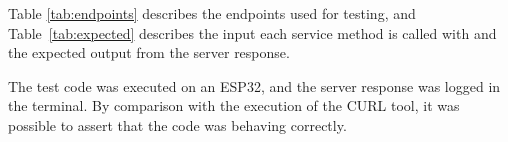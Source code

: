 \documentclass[manuscript,screen]{acmart}
\begin{document}
\begin{table}[b!]
\caption{Description of tested endpoints}
\label{tab:endpoints}
\end{table}

Table \ref{tab:endpoints} describes the endpoints used for testing, and Table~\ref{tab:expected} describes the input each service method is called with and the expected output from the server response.
\begin{table}[ht!]
\caption{Input and output for each endpoint}
\label{tab:expected}
\end{table}
The test code was executed on an ESP32, and the server response was logged in the terminal. 
%
By comparison with the execution of the CURL tool, it was possible to assert that the code was behaving correctly.
\end{document}
